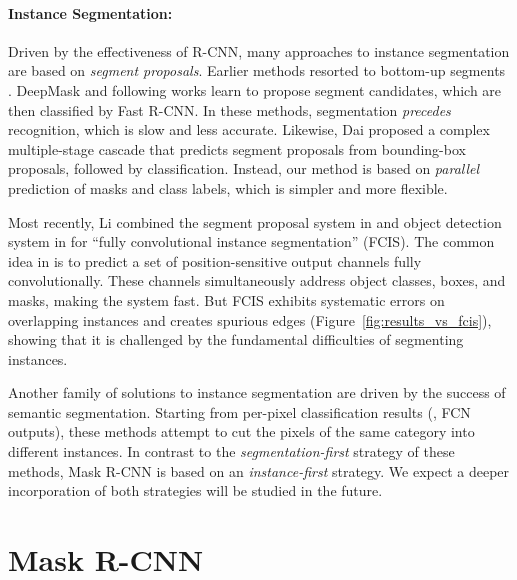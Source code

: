 \documentclass[10pt,twocolumn,letterpaper]{article}
\begin{document}
\paragraph{Instance Segmentation:} Driven by the effectiveness of R-CNN, many approaches to instance segmentation are based on \emph{segment proposals}. Earlier methods \cite{Girshick2014, Hariharan2014, Hariharan2015, Dai2015} resorted to bottom-up segments \cite{Uijlings2013, Arbelaez2014}. DeepMask \cite{Pinheiro2015} and following works \cite{Pinheiro2016, Dai2016a} learn to propose segment candidates, which are then classified by Fast R-CNN. In these methods, segmentation \emph{precedes} recognition, which is slow and less accurate. Likewise, Dai \etal \cite{Dai2016} proposed a complex multiple-stage cascade that predicts segment proposals from bounding-box proposals, followed by classification. Instead, our method is based on \emph{parallel} prediction of masks and class labels, which is simpler and more flexible.

Most recently, Li \etal \cite{Li2017} combined the segment proposal system in \cite{Dai2016a} and object detection system in \cite{Dai2016b} for ``fully convolutional instance segmentation'' (FCIS). The common idea in \cite{Dai2016a, Dai2016b, Li2017} is to predict a set of position-sensitive output channels fully convolutionally. These channels simultaneously address object classes, boxes, and masks, making the system fast. But FCIS exhibits systematic errors on overlapping instances and creates spurious edges (Figure~\ref{fig:results_vs_fcis}), showing that it is challenged by the fundamental difficulties of segmenting instances.

Another family of solutions \cite{Kirillov2017,Bai2017,Arnab2017,Liu2017} to instance segmentation are driven by the success of semantic segmentation. Starting from per-pixel classification results (\eg, FCN outputs), these methods attempt to cut the pixels of the same category into different instances. In contrast to the \emph{segmentation-first} strategy of these methods, Mask R-CNN is based on an \emph{instance-first} strategy. We expect a deeper incorporation of both strategies will be studied in the future.

\section{Mask R-CNN}\label{sec:maskrcnn}
\end{document}
